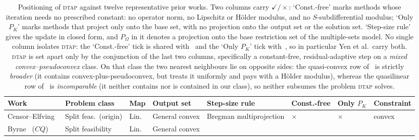 \documentclass[]{interact}
\theoremstyle{plain}
\theoremstyle{definition}
\theoremstyle{remark}
\newcommand{\dtap}{\textsc{dtap}}
\begin{document}
\begin{table}[htbp]
\centering
\caption{Positioning of \textsc{dtap} against twelve representative prior works. Two columns carry
$\checkmark/\times$: `Const.-free' marks methods whose iteration needs no prescribed constant: no operator norm, no Lipschitz or H\"older modulus, and no $S$-subdifferential modulus; `Only
$P_K$' marks methods that project only onto the base set, with no projection onto the output set or
the solution set. `Step-size rule' gives the update in closed form, and $P_\Omega$ in it denotes a projection onto the base restriction set of the multiple-sets model. No single column isolates \dtap: the `Const.-free' tick is shared with~\citep{yang2004,lopez2012,li2013nsfp,yen2019} and the
`Only $P_K$' tick with~\citep{hu2022quasi,wang2021fractional,yen2019}, so in particular Yen et
al.\ carry both. \dtap{} is set apart only by the conjunction of the last two columns, specifically a
constant-free, residual-adaptive step on a \emph{mixed convex--pseudoconvex} class. On that class
the two nearest neighbours lie on opposite sides: the quasi-convex row of~\citep{hu2022quasi} is
strictly \emph{broader} (it contains convex-plus-pseudoconvex, but treats it uniformly and pays with
a H\"older modulus), whereas the quasilinear row of~\citep{yen2019} is \emph{incomparable} (it
neither contains nor is contained in our class), so neither subsumes the problem \dtap{} solves.}
\label{tab:related}
{\scriptsize
\renewcommand{\arraystretch}{1.7}
\setlength{\tabcolsep}{2.5pt}
\begin{tabular}{@{}>{\raggedright\arraybackslash}p{2.7cm}
>{\raggedright\arraybackslash}p{2.5cm} >{\centering\arraybackslash}p{0.9cm}
>{\raggedright\arraybackslash}p{1.5cm} >{\raggedright\arraybackslash}p{3.0cm}
>{\centering\arraybackslash}p{0.8cm} >{\centering\arraybackslash}p{0.62cm}
>{\raggedright\arraybackslash}p{1.9cm}@{}}
\toprule
\textbf{Work} & \textbf{Problem\hspace{0pt} class} & \textbf{Map} & \textbf{Output\hspace{0pt} set} &
\textbf{Step-\hspace{0pt}size rule} & \textbf{Const.-\hspace{0pt}free} & \textbf{Only $P_K$} &
\textbf{Con\-straint} \\
\midrule
Censor--Elfving~\citep{censor1994} & Split feas.\ (origin) & Lin. & General convex &
Bregman multi\-projection & $\times$ & $\times$ & convex \\
Byrne~\citep{byrne2002} ($CQ$) & Split feasibility & Lin. & General convex &

\end{tabular}}
\end{table}
\end{document}
